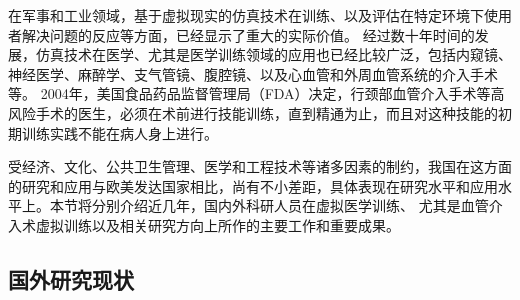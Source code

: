 
在军事和工业领域，基于虚拟现实的仿真技术在训练、以及评估在特定环境下使用者解决问题的反应等方面，已经显示了重大的实际价值\cite{Goodwin1978Simulator}\cite{Rolfe1986Simulators}\cite{Ressler1999Simulators}\cite{Wachtel1985Simulators}\cite{Liu2013Military}。
经过数十年时间的发展\cite{Dawson1998}，仿真技术在医学、尤其是医学训练领域的应用也已经比较广泛，包括内窥镜\cite{Vining1995Endoscopy}\cite{Preminger1996Endoscopy}、神经医学\cite{Kockro2000Neurosurgery}\cite{Cotin2005EVE}\cite{Ma2007NeuroCath}、麻醉学\cite{Gaba1988Anesthesiology}、支气管镜\cite{Vining1996Bronchoscopy}、腹腔镜\cite{Hon1994Laparoscopy}\cite{Derossis1998Laparoscopy}、以及心血管和外周血管系统的介入手术\cite{Chui1998ICard}\cite{Cotin2000ICTS}\cite{Tan2012NUDT}等。
2004年，美国食品药品监督管理局（FDA）决定，行颈部血管介入手术等高风险手术的医生，必须在术前进行技能训练，直到精通为止，而且对这种技能的初期训练实践不能在病人身上进行\cite{Dawson2006Medicine}。

受经济、文化、公共卫生管理、医学和工程技术等诸多因素的制约，我国在这方面的研究和应用与欧美发达国家相比，尚有不小差距，具体表现在研究水平和应用水平上。本节将分别介绍近几年，国内外科研人员在虚拟医学训练、
尤其是血管介入术虚拟训练以及相关研究方向上所作的主要工作和重要成果。

\subsection{国外研究现状}
\label{sec1-3-1}

